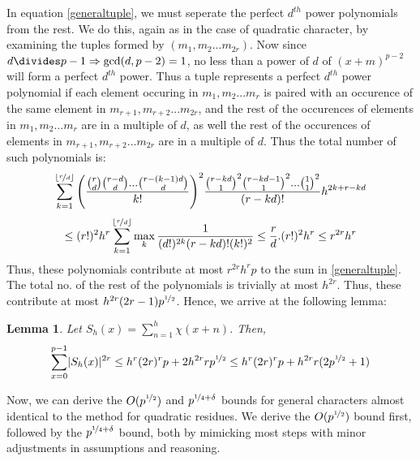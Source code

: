 \documentclass{report}
\newtheorem*{lemma*}{Lemma}
\begin{document}
In equation \ref{generaltuple}, we must seperate the perfect $d^{th}$ power polynomials from the rest. We do this, again as in the case of quadratic character, by examining the tuples formed by $(m_1, m_2...m_{2r})$. Now since $d \divides p-1\Rightarrow \gcd(d, p-2)=1$, no less than a power of $d$ of $(x+m)^{p-2}$ will form a perfect $d^{th}$ power. Thus a tuple represents a perfect $d^{th}$ power polynomial if each element occuring in $m_1, m_2...m_{r}$ is paired with an occurence of the same element in $m_{r+1}, m_{r+2}...m_{2r}$, and the rest of the occurences of elements in $m_1, m_2...m_{r}$ are in a multiple of $d$, as well the rest of the occurences of elements in $m_{r+1}, m_{r+2}...m_{2r}$ are in a multiple of $d$. Thus the total number of such polynomials is:
$$\sum_{k=1}^{\lfloor\nicefrac{r}{d}\rfloor}\Bigg(\frac{\binom{r}{d}\binom{r-d}{d}...\binom{r-(k-1)d}{d}}{k!}\Bigg)^2\frac{\binom{r-kd}{1}^2\binom{r-kd-1}{1}^2...\binom{1}{1}^2}{(r-kd)!}h^{2k+r-kd}$$
\[
\leq (r!)^2 h^{r}\sum_{k=1}^{\lfloor\nicefrac{r}{d}\rfloor}\max_k \frac{1}{(d!)^{2k}(r-kd)!(k!)^2} \leq \frac{r}{d}.(r!)^2 h^{r} \leq r^{2r}h^r
\]
Thus, these polynomials contribute at most $r^{2r}h^rp$ to the sum in \ref{generaltuple}.
The total no. of the rest of the polynomials is trivially at most $h^{2r}$. Thus, these contribute at most $h^{2r}(2r-1)p^{\nicefrac{1}{2}}$. Hence, we arrive at the following lemma:
\begin{lemma*}
Let $S_h(x)=\sum\limits_{n=1}^{h}\chi(x+n)$. Then,
\begin{equation} \label{lemma2gen}
\sum\limits_{x=0}^{p-1}\lvert S_h(x)\rvert^{2r}\leq h^{r}(2r)^{r}p+2h^{2r}rp^{\nicefrac{1}{2}}\leq h^{r}(2r)^{r}p+h^{2r}r(2p^{\nicefrac{1}{2}}+1)
\end{equation}
\end{lemma*}
Now, we can derive the $O(p^{\nicefrac{1}{2}})$ and $p^{\nicefrac{1}{4}+\delta}$ bounds for general characters almost identical to the method for quadratic residues. We derive the $O(p^{\nicefrac{1}{2}})$ bound first, followed by the $p^{\nicefrac{1}{4}+\delta}$ bound, both by mimicking most steps with minor adjustments in assumptions and reasoning.%
\end{document}
